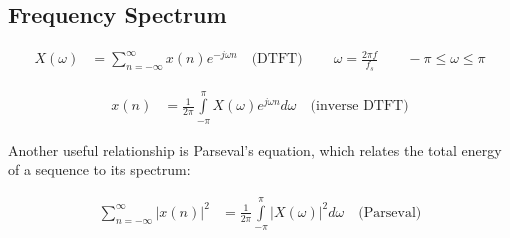 \subsection{Frequency Spectrum}
\begin{align*}
	X(\omega)&= \sum\limits_{n=-\infty}^{\infty} x(n)e^{-j\omega n} \quad \text{(DTFT)} \
	\qquad \omega = \frac{2 \pi f}{f_s} \qquad -\pi \leq \omega \leq \pi
\end{align*}

\begin{align*}
	x(n)&= \frac{1}{2\pi} \int\limits_{-\pi}^{\pi} X(\omega)e^{j\omega n} d\omega \quad \text{(inverse DTFT)} 
\end{align*}

Another useful relationship is Parseval’s equation, which relates the total energy of
a sequence to its spectrum:

\begin{align*}
	\sum_{n=-\infty}^{\infty} |x(n)|^2&= \frac{1}{2\pi} \int\limits_{-\pi}^{\pi} |X(\omega)|^2 d\omega \quad \text{(Parseval)} 
\end{align*}

